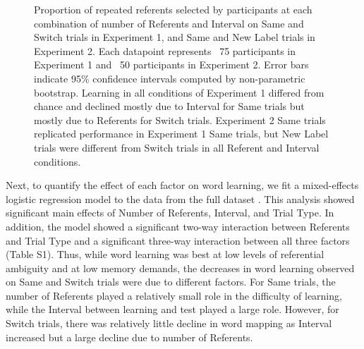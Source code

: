 \documentclass{pnastwo}
\begin{document}
\begin{article}
 \begin{figure}[tb]
	\caption{\label{fig:exp1_2_data} Proportion of repeated referents selected by participants at each combination of number of Referents and Interval on Same and Switch trials in Experiment 1, and Same and New Label trials in Experiment 2. Each datapoint represents ~75 participants in Experiment 1 and ~50 participants in Experiment 2. Error bars indicate 95\% confidence intervals computed by non-parametric bootstrap. Learning in all conditions of Experiment 1 differed from chance and declined mostly due to Interval for Same trials but mostly due to Referents for Switch trials. Experiment 2 Same trials replicated performance in Experiment 1 Same trials, but New Label trials were different from Switch trials in all Referent and Interval conditions.} 
\end{figure}

Next, to quantify the effect of each factor on word learning, we fit a mixed-effects logistic regression model to the data from the full dataset \citep{Baayen2008}. This analysis showed significant main effects of Number of Referents, Interval, and Trial Type. In addition, the model showed a significant two-way interaction between Referents and Trial Type and a significant three-way interaction between all three factors (Table S1). Thus, while word learning was best at low levels of referential ambiguity and at low memory demands, the decreases in word learning observed on Same and Switch trials were due to different factors. For Same trials, the number of Referents played a relatively small role in the difficulty of learning, while the Interval between learning and test played a large role. However, for Switch trials, there was relatively little decline in word mapping as Interval increased but a large decline due to number of Referents. 


\end{article}
\end{document}
